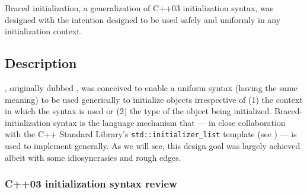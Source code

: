 


\setcounter{table}{0}
\setcounter{footnote}{0}
\setcounter{lstlisting}{0}

Braced initialization, a generalization of C++03 initialization syntax,
was designed with the intention designed to be used safely and uniformly
in any initialization context.

\subsection[Description]{Description}\label{description}

, originally dubbed , was conceived to enable a uniform syntax (having the
same meaning) to be used generically to initialize objects irrespective
of (1) the context in which the syntax is used or (2) the type of the
object being initialized. Braced-initialization syntax is the language
mechanism that --- in close collaboration with the C++ Standard
Library's \lstinline!std::initializer_list! template (see ) --- is used to implement
 generally. As we will see, this design goal
was largely achieved albeit with some idiosyncrasies and rough edges.

\subsubsection[C++03 initialization syntax review]{C++03 initialization syntax review}\label{c++03-initialization-syntax-review}

